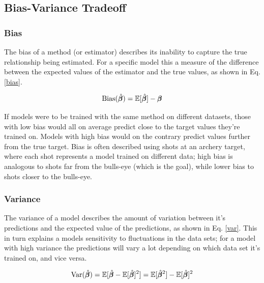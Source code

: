 \subsection{Bias-Variance Tradeoff}

\subsubsection{Bias}
The bias of a method (or estimator) describes its inability to capture the true relationship being estimated. For a specific model this a measure of the difference between the expected values of the estimator and the true values, as shown in Eq. \ref{bias}. 

\begin{equation}\label{bias}
    \text{Bias}(\hat{\boldsymbol{\beta}}) = \mathbb{E}[\hat{\boldsymbol{\beta}}]-\boldsymbol{\beta}
\end{equation}

If models were to be trained with the same method on different datasets, those with low bias would all on average predict close to the target values they're trained on. Models with high bias would on the contrary predict values further from the true target. Bias is often described using shots at an archery target, where each shot represents a model trained on different data; high bias is analogous to shots far from the bulls-eye (which is the goal), while lower bias to shots closer to the bulls-eye.

\subsubsection{Variance}

The variance of a model describes the amount of variation between it's predictions and the expected value of the predictions, as shown in Eq. \ref{var}. This in turn explains a models sensitivity to fluctuations in the data sets; for a model with high variance the predictions will vary a lot depending on which data set it's trained on, and vice versa.

\begin{equation}\label{var}
    \text{Var}(\hat{\boldsymbol{\beta}}) = \mathbb{E}[\hat{\boldsymbol{\beta}}-\mathbb{E}[\hat{\boldsymbol{\beta}}]^2] = \mathbb{E}[\hat{\boldsymbol{\beta}}^2] - \mathbb{E}[\hat{\boldsymbol{\beta}}]^2
\end{equation}

